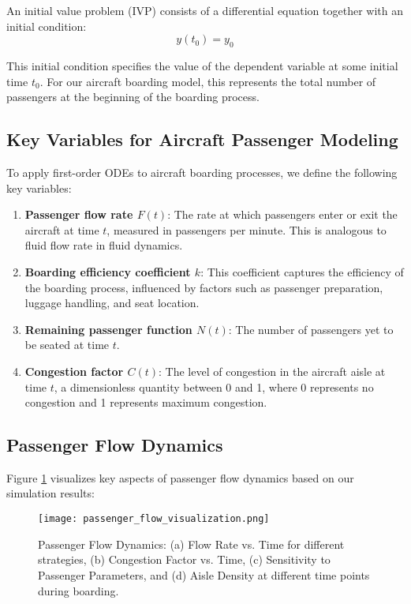 \documentclass[12pt,a4paper]{article}
\begin{document}
An initial value problem (IVP) consists of a differential equation together with an initial condition:
\begin{equation}
y(t_0) = y_0
\label{eq:ivp}
\end{equation}

This initial condition specifies the value of the dependent variable at some initial time $t_0$. For our aircraft boarding model, this represents the total number of passengers at the beginning of the boarding process.

\subsection{Key Variables for Aircraft Passenger Modeling}
To apply first-order ODEs to aircraft boarding processes, we define the following key variables:

\begin{enumerate}
\item \textbf{Passenger flow rate $F(t)$}: The rate at which passengers enter or exit the aircraft at time $t$, measured in passengers per minute. This is analogous to fluid flow rate in fluid dynamics.

\item \textbf{Boarding efficiency coefficient $k$}: This coefficient captures the efficiency of the boarding process, influenced by factors such as passenger preparation, luggage handling, and seat location.

\item \textbf{Remaining passenger function $N(t)$}: The number of passengers yet to be seated at time $t$.

\item \textbf{Congestion factor $C(t)$}: The level of congestion in the aircraft aisle at time $t$, a dimensionless quantity between 0 and 1, where 0 represents no congestion and 1 represents maximum congestion.
\end{enumerate}

\subsection{Passenger Flow Dynamics}

Figure \ref{fig:passenger_flow} visualizes key aspects of passenger flow dynamics based on our simulation results:

\begin{figure}[H]
\centering
\texttt{[image: passenger\_flow\_visualization.png]}
\caption{Passenger Flow Dynamics: (a) Flow Rate vs. Time for different strategies, (b) Congestion Factor vs. Time, (c) Sensitivity to Passenger Parameters, and (d) Aisle Density at different time points during boarding.}
\label{fig:passenger_flow}
\end{figure}
\end{document}
